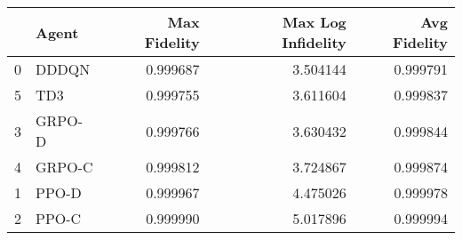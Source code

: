 \begin{tabular}{llrrr}
\toprule
 & Agent & Max Fidelity & Max Log Infidelity & Avg Fidelity \\
\midrule
0 & DDDQN & 0.999687 & 3.504144 & 0.999791 \\
5 & TD3 & 0.999755 & 3.611604 & 0.999837 \\
3 & GRPO-D & 0.999766 & 3.630432 & 0.999844 \\
4 & GRPO-C & 0.999812 & 3.724867 & 0.999874 \\
1 & PPO-D & 0.999967 & 4.475026 & 0.999978 \\
2 & PPO-C & 0.999990 & 5.017896 & 0.999994 \\
\bottomrule
\end{tabular}
